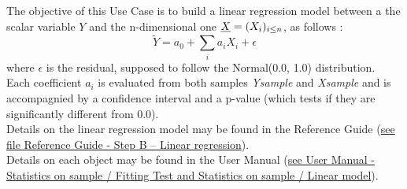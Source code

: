 \renewcommand{\filename}{docUC_InputWithData_LinearModel.tex}
\renewcommand{\filetitle}{UC : Building and validating a linear model from two samples}

\HeaderIIILevel






The objective of this Use Case is to build a linear regression model between a the scalar variable $Y$ and the n-dimensional one ${\underline{X}} = (X_i)_{i \leq n}$, as follows :
$$
\tilde{Y} = a_0 + \sum_i a_i X_i + \epsilon
$$
where $\epsilon$ is the residual, supposed to follow the Normal(0.0, 1.0) distribution.\\
Each coefficient $a_i$ is evaluated from both samples {\itshape Ysample} and {\itshape Xsample} and is accompagnied by a confidence interval and a p-value (which tests if they are significantly different from 0.0).\\




Details on the linear regression model  may be found in the Reference Guide (\href{OpenTURNS_ReferenceGuide.pdf}{see file Reference Guide - Step B -- Linear regression}).\\

Details on each object may be found in the User Manual  (\href{OpenTURNS_UserManual_TUI.pdf}{see User Manual - Statistics on sample / Fitting Test and Statistics on sample / Linear model}).\\


